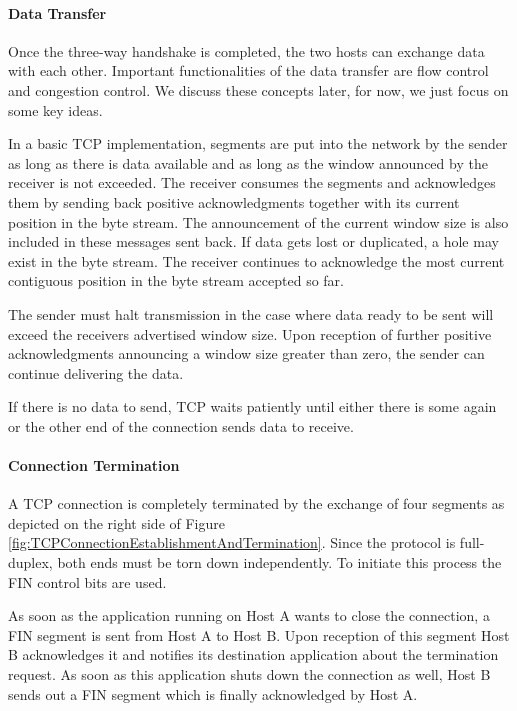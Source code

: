 \paragraph{Data Transfer}

Once the three-way handshake is completed, the two hosts can exchange data with each other. Important functionalities of the data transfer are flow control and congestion control. We discuss these concepts later, for now, we just focus on some key ideas. 

In a basic TCP implementation, segments are put into the network by the sender as long as there is data available and as long as the window announced by the receiver is not exceeded. The receiver consumes the segments and acknowledges them by sending back positive acknowledgments together with its current position in the byte stream. The announcement of the current window size is also included in these messages sent back. If data gets lost or duplicated, a hole may exist in the byte stream. The receiver continues to acknowledge the most current contiguous position in the byte stream accepted so far.

The sender must halt transmission in the case where data ready to be sent will exceed the receivers advertised window size. Upon reception of further positive acknowledgments announcing a window size greater than zero, the sender can continue delivering the data.

If there is no data to send, TCP waits patiently until either there is some again or the other end of the connection sends data to receive.  

\paragraph{Connection Termination}

A TCP connection is completely terminated by the exchange of four segments as depicted on the right side of Figure \ref{fig:TCPConnectionEstablishmentAndTermination}. Since the protocol is full-duplex, both ends must be torn down independently. To initiate this process the FIN control bits are used. 

As soon as the application running on Host A wants to close the connection, a FIN segment is sent from Host A to Host B. Upon reception of this segment Host B acknowledges it and notifies its destination application about the termination request. As soon as this application shuts down the connection as well, Host B sends out a FIN segment which is finally acknowledged by Host A.

